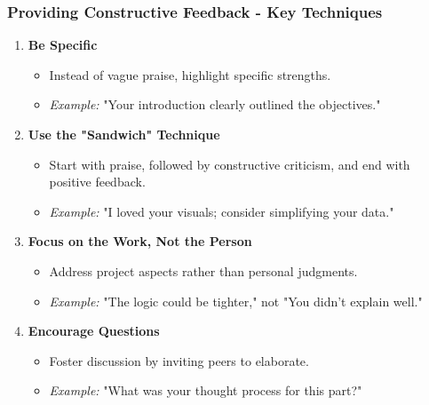 \documentclass[aspectratio=169]{beamer}
\begin{document}
\begin{frame}[fragile]
    \frametitle{Providing Constructive Feedback - Key Techniques}
    \begin{enumerate}
        \item \textbf{Be Specific}
            \begin{itemize}
                \item Instead of vague praise, highlight specific strengths.
                \item \textit{Example:} "Your introduction clearly outlined the objectives."
            \end{itemize}
        \item \textbf{Use the "Sandwich" Technique}
            \begin{itemize}
                \item Start with praise, followed by constructive criticism, and end with positive feedback.
                \item \textit{Example:} "I loved your visuals; consider simplifying your data."
            \end{itemize}
        \item \textbf{Focus on the Work, Not the Person}
            \begin{itemize}
                \item Address project aspects rather than personal judgments.
                \item \textit{Example:} "The logic could be tighter," not "You didn't explain well."
            \end{itemize}
        \item \textbf{Encourage Questions}
            \begin{itemize}
                \item Foster discussion by inviting peers to elaborate.
                \item \textit{Example:} "What was your thought process for this part?"
            \end{itemize}
    \end{enumerate}
\end{frame}
\end{document}
